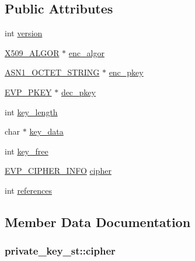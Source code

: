 \subsection*{Public Attributes}
\begin{DoxyCompactItemize}
\item 
int \hyperlink{structprivate__key__st_a16bd44f055e649572a0f5b0d62a92219}{version}
\item 
\hyperlink{ossl__typ_8h_aa2b6185e6254f36f709cd6577fb5022e}{X509\+\_\+\+A\+L\+G\+OR} $\ast$ \hyperlink{structprivate__key__st_a866f6478e044bb225e3c9983df4b48a2}{enc\+\_\+algor}
\item 
\hyperlink{ossl__typ_8h_afbd05e94e0f0430a2b729473efec88c1}{A\+S\+N1\+\_\+\+O\+C\+T\+E\+T\+\_\+\+S\+T\+R\+I\+NG} $\ast$ \hyperlink{structprivate__key__st_a514cc301684203bf755bbc83033f51aa}{enc\+\_\+pkey}
\item 
\hyperlink{ossl__typ_8h_a2fca4fef9e4c7a2a739b1ea04acb56ce}{E\+V\+P\+\_\+\+P\+K\+EY} $\ast$ \hyperlink{structprivate__key__st_ab6fa39f8beba82366b4a0c9af1d68231}{dec\+\_\+pkey}
\item 
int \hyperlink{structprivate__key__st_a4fd59ffeb31b0bc4acf1330ba4c1cfab}{key\+\_\+length}
\item 
char $\ast$ \hyperlink{structprivate__key__st_a648ff8dfa3759f8cf7e78e8f0acf621e}{key\+\_\+data}
\item 
int \hyperlink{structprivate__key__st_a6cba7d7973cf8425493d996dd8464e29}{key\+\_\+free}
\item 
\hyperlink{evp_8h_a0ff32d74885621bf0ee4f962602e6c9b}{E\+V\+P\+\_\+\+C\+I\+P\+H\+E\+R\+\_\+\+I\+N\+FO} \hyperlink{structprivate__key__st_afeef179b98e87f1f950eb977dda61fc4}{cipher}
\item 
int \hyperlink{structprivate__key__st_a96a0fec0281fed6acf1d455f2d5c93ff}{references}
\end{DoxyCompactItemize}


\subsection{Member Data Documentation}
\subsubsection[{\texorpdfstring{cipher}{cipher}}]{ private\+\_\+key\+\_\+st\+::cipher}\hypertarget{structprivate__key__st_afeef179b98e87f1f950eb977dda61fc4}{}\label{structprivate__key__st_afeef179b98e87f1f950eb977dda61fc4}
